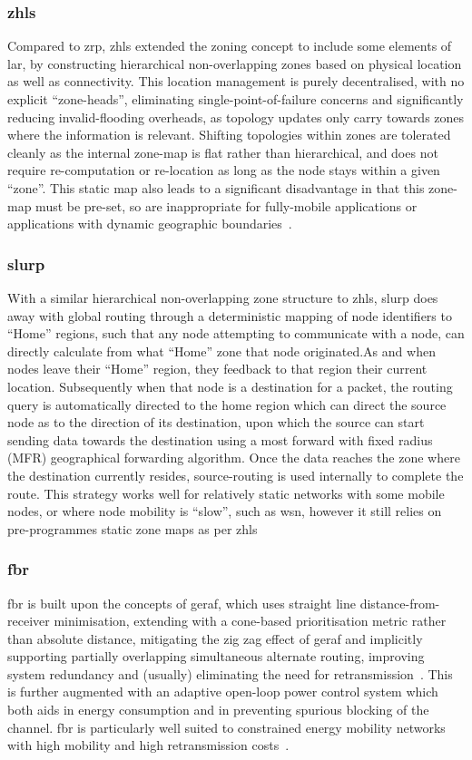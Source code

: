 \subsubsection{\gls{zhls}}
Compared to \gls{zrp}, \gls{zhls} extended the zoning concept to include some elements of \gls{lar}, by constructing hierarchical non-overlapping zones based on physical location as well as connectivity. This location management is purely decentralised, with no explicit ``zone-heads'', eliminating single-point-of-failure concerns and significantly reducing invalid-flooding overheads, as topology updates only carry towards zones where the information is relevant. Shifting topologies within zones are tolerated cleanly as the internal zone-map is flat rather than hierarchical, and does not require re-computation or re-location as long as the node stays within a given ``zone''. This static map also leads to a significant disadvantage in that this zone-map must be pre-set, so are inappropriate for fully-mobile applications or applications with dynamic geographic boundaries~\cite{Joa-Ng1999,Hamma2006}.
\subsubsection{\gls{slurp}}
With a similar hierarchical non-overlapping zone structure to \gls{zhls}, \gls{slurp} does away with global routing through a deterministic mapping of node identifiers to ``Home'' regions, such that any node attempting to communicate with a node, can directly calculate from what ``Home'' zone that node originated.As and when nodes leave their ``Home'' region, they feedback to that region their current location. Subsequently when that node is a destination for a packet, the routing query is automatically directed to the home region which can direct the source node as to the direction of its destination, upon which the source can start sending data towards the destination using a most forward with fixed radius (MFR) geographical forwarding algorithm. Once the data reaches the zone where the destination currently resides, source-routing is used internally to complete the route. This strategy works well for relatively static networks with some mobile nodes, or where node mobility is ``slow'', such as \gls{wsn}, however it still relies on pre-programmes static zone maps as per \gls{zhls}~\cite{Woo2001}
\subsubsection{\gls{fbr}}
\gls{fbr} is built upon the concepts of \gls{geraf}, which uses straight line distance-from-receiver minimisation, extending with a cone-based prioritisation metric rather than absolute distance, mitigating the zig zag effect of \gls{geraf} and implicitly supporting partially overlapping simultaneous alternate routing, improving system redundancy and (usually) eliminating the need for retransmission~\cite{Jornet2008}.
This is further augmented with an adaptive open-loop power control system which both aids in energy consumption and in preventing spurious blocking of the channel.
\gls{fbr} is particularly well suited to constrained energy mobility networks with high mobility and high retransmission costs~\cite{Noh2012}.


